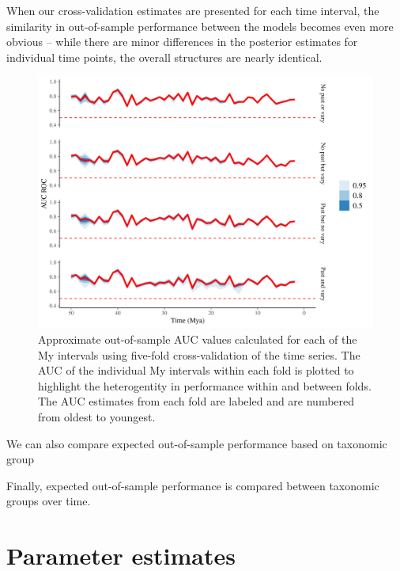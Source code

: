 \documentclass[12pt,letterpaper]{article}
\begin{document}
When our cross-validation estimates are presented for each time interval, the similarity in out-of-sample performance between the models becomes even more obvious -- while there are minor differences in the posterior estimates for individual time points, the overall structures are nearly identical. 

\begin{figure}[ht]
  \centering
  \includegraphics[width=\textwidth,height=0.5\textheight,keepaspectratio=true]{../results/figure/fold_auc_time}
  \caption{Approximate out-of-sample AUC values calculated for each of the My intervals using five-fold cross-validation of the time series. The AUC of the individual My intervals within each fold is plotted to highlight the heterogentity in performance within and between folds. The AUC estimates from each fold are labeled and are numbered from oldest to youngest.}
  \label{fig:fold_auc_time}
\end{figure}


We can also compare expected out-of-sample performance based on taxonomic group


Finally, expected out-of-sample performance is compared between taxonomic groups over time.









\section{Parameter estimates}
\end{document}
